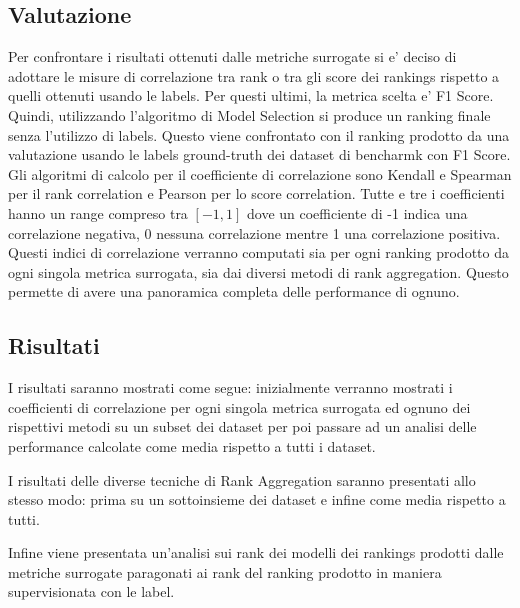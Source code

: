 \subsection{Valutazione}
Per confrontare i risultati ottenuti dalle metriche surrogate si e' deciso di adottare le misure di correlazione tra rank o tra gli score dei rankings rispetto a quelli ottenuti usando le labels. Per questi ultimi, la metrica scelta e' F1 Score.
Quindi, utilizzando l'algoritmo di Model Selection si produce un ranking finale senza l'utilizzo di labels. Questo viene confrontato con il ranking prodotto  da una valutazione usando le labels ground-truth dei dataset di bencharmk con F1 Score.
Gli algoritmi di calcolo per il coefficiente di correlazione sono Kendall e Spearman per il rank correlation e Pearson per lo score correlation. Tutte e tre i coefficienti hanno un range compreso tra $[-1,1]$ dove un coefficiente di -1 indica una correlazione negativa, 0 nessuna correlazione mentre 1 una correlazione positiva.
Questi indici di correlazione verranno computati sia per ogni ranking prodotto da ogni singola metrica surrogata, sia dai diversi metodi di rank aggregation. Questo permette di avere una panoramica completa delle performance di ognuno.





\subsection{Risultati}
I risultati saranno mostrati come segue: inizialmente verranno mostrati i coefficienti di correlazione per ogni singola metrica surrogata ed ognuno dei rispettivi metodi su un subset dei dataset per poi passare ad un analisi delle performance calcolate come media rispetto a tutti i dataset.

I risultati delle diverse tecniche di Rank Aggregation saranno presentati allo stesso modo: prima su un sottoinsieme dei dataset e infine come media rispetto a tutti.

Infine viene presentata un'analisi sui rank dei modelli dei rankings prodotti dalle metriche surrogate paragonati ai rank del ranking prodotto in maniera supervisionata con le label.
